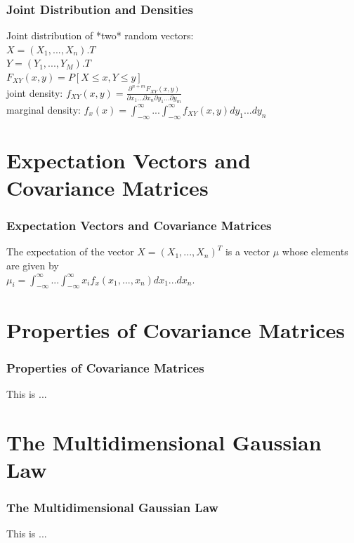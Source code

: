 \documentclass{beamer}
\begin{document}
\begin{frame}
\frametitle{Joint Distribution and Densities}
Joint distribution of *two* random vectors:\newline\\
$X= (X_1,...,X_n).T$\newline\\
$Y = (Y_1,...,Y_M).T$\newline\\
$F_{XY}(x,y) = P[X\le x,Y\le y]$\newline\\
joint density: $f_{XY}(x,y) = \frac{\partial^{n+m}F_{XY}(x,y)}{\partial{x_1}...\partial{x_n}\partial{y_1}...\partial{y_m}}$\newline\\
marginal density: $f_x(x)=\int_{-\infty}^{\infty}...\int_{-\infty}^{\infty} f_{XY}(x,y)dy_1...dy_n $\newline\\

\end{frame}

\section {Expectation Vectors and Covariance Matrices}
\begin{frame}
\frametitle{Expectation Vectors and Covariance Matrices}
The expectation of the vector $X=(X_1,...,X_n)^T$ is a vector $\mu$ whose elements are given by\newline\\
$\mu_i = \int_{-\infty}^{\infty}...\int_{-\infty}^{\infty} x_if_x(x_1,...,x_n)dx_1...dx_n.$
\end{frame}



\section{Properties of Covariance Matrices}
\begin{frame}
\frametitle{Properties of Covariance Matrices}
This is ...
\end{frame}


\section {The Multidimensional Gaussian Law}
\begin{frame}
\frametitle{The Multidimensional Gaussian Law}
This is ...
\end{frame}
\end{document}
